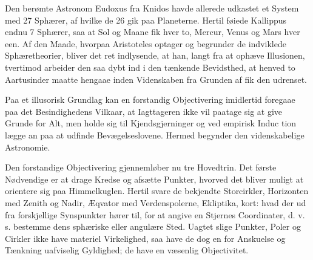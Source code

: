 \documentclass[12pt,a4paper]{book}
\begin{document}
Den berømte Astronom Eudoxus fra Knidos havde allerede udkastet et
System med 27 Sphærer, af hvilke de 26 gik paa Planeterne. Hertil
føiede Kallippus endnu 7 Sphærer, saa at Sol og Maane fik hver to,
Mercur, Venus og Mars hver een. Af den Maade, hvorpaa Aristoteles
optager og begrunder de indviklede Sphæretheorier, bliver det ret
indlysende, at han, langt fra at ophæve Illusionen, tvertimod arbeider
den saa dybt ind i den tænkende Bevidsthed, at henved to Aartusinder
maatte hengaae inden Videnskaben fra Grunden af fik den udrenset.

Paa et illusorisk Grundlag kan en forstandig Objectivering imidlertid
foregaae paa det Besindighedens Vilkaar, at Iagttageren ikke vil
paatage sig at give Grunde for Alt, men holde sig til Kjendsgjerninger
og ved empirisk Induc\-%
tion lægge an paa at udfinde Bevægelseslovene. Hermed begynder den
videnskabelige Astronomie.

Den forstandige Objectivering gjennemløber nu tre Hovedtrin. Det første
Nødvendige er at drage Kredse og afsætte Punkter, hvorved det bliver
muligt at orientere sig paa Himmelkuglen. Hertil svare de bekjendte
Storcirkler, Horizonten med Zenith og Nadir, Æqvator med
Verdenspolerne, Ekliptika, kort: hvad der ud fra forskjellige
Synspunkter hører til, for at angive en Stjernes Coordinater, d. v. s.
bestemme dens sphæriske eller angulære Sted. Uagtet slige Punkter,
Poler og Cirkler ikke have materiel Virkelighed, saa have de dog en for
Anskuelse og Tænkning uafviselig Gyldighed; de have en væsenlig
Objectivitet.
\end{document}
